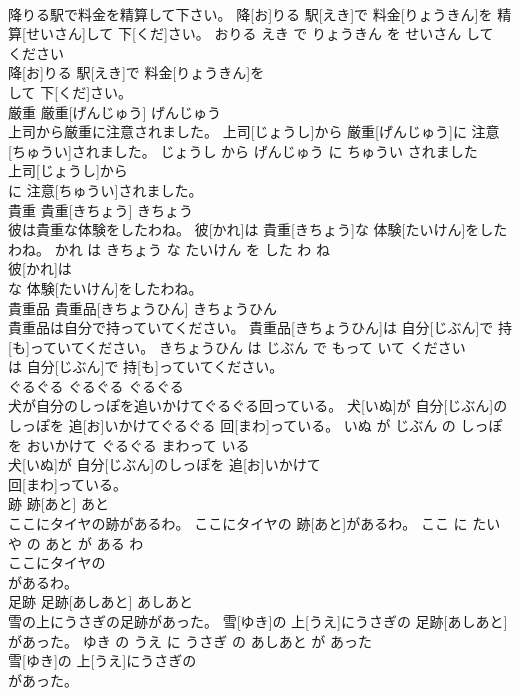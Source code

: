 \documentclass[8pt]{extreport}
\begin{document}
\begin{CJK}{UTF8}{min}
\\	降りる駅で料金を精算して下さい。	降[お]りる 駅[えき]で 料金[りょうきん]を 精算[せいさん]して 下[くだ]さい。	おりる えき で りょうきん を せいさん して ください	
\\	降[お]りる 駅[えき]で 料金[りょうきん]を
\\	して 下[くだ]さい。			
\\	厳重	厳重[げんじゅう]	げんじゅう	
\\	上司から厳重に注意されました。	上司[じょうし]から 厳重[げんじゅう]に 注意[ちゅうい]されました。	じょうし から げんじゅう に ちゅうい されました	
\\	上司[じょうし]から
\\	に 注意[ちゅうい]されました。			
\\	貴重	貴重[きちょう]	きちょう	
\\	彼は貴重な体験をしたわね。	彼[かれ]は 貴重[きちょう]な 体験[たいけん]をしたわね。	かれ は きちょう な たいけん を した わ ね	
\\	彼[かれ]は
\\	な 体験[たいけん]をしたわね。			
\\	貴重品	貴重品[きちょうひん]	きちょうひん	
\\	貴重品は自分で持っていてください。	貴重品[きちょうひん]は 自分[じぶん]で 持[も]っていてください。	きちょうひん は じぶん で もって いて ください	
\\	は 自分[じぶん]で 持[も]っていてください。			
\\	ぐるぐる	ぐるぐる	ぐるぐる	
\\	犬が自分のしっぽを追いかけてぐるぐる回っている。	犬[いぬ]が 自分[じぶん]のしっぽを 追[お]いかけてぐるぐる 回[まわ]っている。	いぬ が じぶん の しっぽ を おいかけて ぐるぐる まわって いる	
\\	犬[いぬ]が 自分[じぶん]のしっぽを 追[お]いかけて
\\	回[まわ]っている。			
\\	跡	跡[あと]	あと	
\\	ここにタイヤの跡があるわ。	ここにタイヤの 跡[あと]があるわ。	ここ に たいや の あと が ある わ	
\\	ここにタイヤの
\\	があるわ。			
\\	足跡	足跡[あしあと]	あしあと	
\\	雪の上にうさぎの足跡があった。	雪[ゆき]の 上[うえ]にうさぎの 足跡[あしあと]があった。	ゆき の うえ に うさぎ の あしあと が あった	
\\	雪[ゆき]の 上[うえ]にうさぎの
\\	があった。			

\end{CJK}
\end{document}
